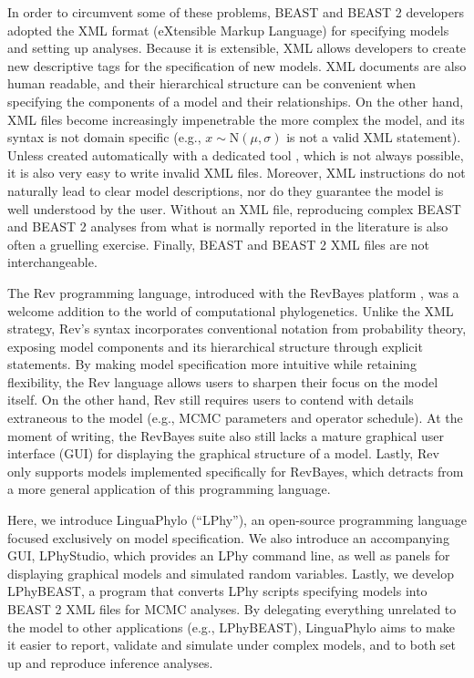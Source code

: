 \documentclass[10pt,letterpaper,table]{article}
\begin{document}
In order to circumvent some of these problems, BEAST \cite{beast} and
BEAST 2 \cite{beast2} developers adopted the XML format (eXtensible
Markup Language) for specifying models and setting up analyses.
Because it is extensible, XML allows developers to create new
descriptive tags for the specification of new models.
XML documents are also human readable, and their hierarchical
structure can be convenient when specifying the components of a model
and their relationships.
On the other hand, XML files become increasingly impenetrable the more
complex the model, and its syntax is not domain specific (e.g., $x
\sim \text{N}(\mu, \sigma)$ is not a valid XML statement).
Unless created automatically with a dedicated tool \cite{beauti},
which is not always possible, it is also very easy to write 
invalid XML files.
Moreover, XML instructions do not naturally lead to clear model
descriptions, nor do they guarantee the model is well understood by
the user.
Without an XML file, reproducing complex BEAST and BEAST 2 analyses
from what is normally reported in the literature is also often a
gruelling exercise.
Finally, BEAST and BEAST 2 XML files are not interchangeable. 

The Rev programming language, introduced with the RevBayes platform
\cite{revbayes}, was a welcome addition to the world of computational
phylogenetics. 
Unlike the XML strategy, Rev's syntax incorporates conventional
notation from probability theory, exposing model
components and its hierarchical structure through explicit statements.
By making model specification more intuitive while retaining
flexibility, the Rev language allows users to sharpen their focus on
the model itself.
On the other hand, Rev still requires users to contend with
details extraneous to the model (e.g., MCMC parameters and operator
schedule).
At the moment of writing, the RevBayes suite also still lacks a mature
graphical user interface (GUI) for displaying the graphical structure
of a model.
Lastly, Rev only supports models implemented specifically for
RevBayes, which detracts from a more general application of this
programming language.

Here, we introduce LinguaPhylo (``LPhy''), an open-source programming
language focused exclusively on model specification.
We also introduce an accompanying GUI, LPhyStudio, which provides an
LPhy command line, as well as panels for displaying graphical models
and simulated random variables.
Lastly, we develop LPhyBEAST, a program that converts LPhy scripts
specifying models into BEAST 2 XML files for MCMC analyses.
By delegating everything unrelated to the model to other applications
(e.g., LPhyBEAST), LinguaPhylo aims to make it easier to report,
validate and simulate under complex models, and to both set up and
reproduce inference analyses.
\end{document}
